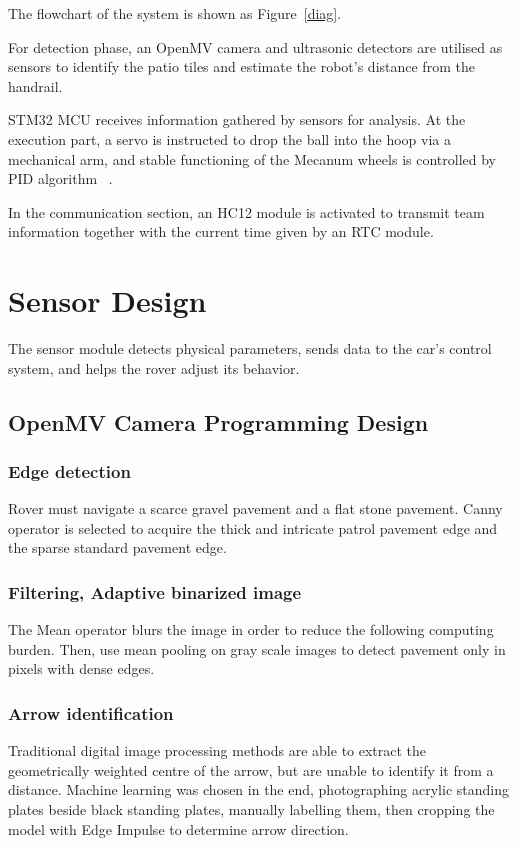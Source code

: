 \documentclass{article}
\begin{document}
The flowchart of the system is shown as Figure~\ref{diag}.

For detection phase, an OpenMV camera and ultrasonic detectors are utilised as sensors to identify the patio tiles and estimate the robot's distance from the handrail.

STM32 MCU receives information gathered by sensors for analysis. At the execution part, a servo is instructed to drop the ball into the hoop via a mechanical arm, and stable functioning of the Mecanum wheels is controlled by PID algorithm~\cite{pid} .

In the communication section, an HC12 module is activated to transmit team information together with the current time given by an RTC module.

\section{Sensor Design}
The sensor module detects physical parameters, sends data to the car's control system, and helps the rover adjust its behavior.

    \subsection{OpenMV Camera Programming Design}
    
        \subsubsection{Edge detection}
        Rover must navigate a scarce gravel pavement and a flat stone pavement. Canny operator is selected to acquire the thick and intricate patrol pavement edge and the sparse standard pavement edge.
        
        \subsubsection{Filtering, Adaptive binarized image}
        The Mean operator blurs the image in order to reduce the following computing burden. Then, use mean pooling on gray scale images to detect pavement only in pixels with dense edges.
        
        \subsubsection{Arrow identification}
        Traditional digital image processing methods are able to extract the geometrically weighted centre of the arrow, but are unable to identify it from a distance. Machine learning was chosen in the end, photographing acrylic standing plates beside black standing plates, manually labelling them, then cropping the model with Edge Impulse to determine arrow direction.
        
\end{document}

